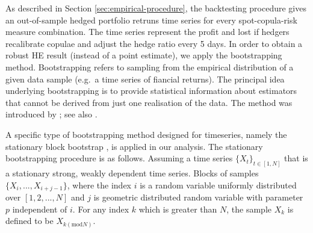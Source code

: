 

As described in Section \ref{sec:empirical-procedure}, the backtesting procedure gives
an out-of-sample hedged portfolio retruns time series for every spot-copula-risk measure combination. 
The time series represent the profit and lost if hedgers recalibrate copulae and adjust the hedge ratio every 5 days.  
In order to obtain a robust HE result (instead of a point estimate), we apply the bootstrapping method.
Bootstrapping refers to sampling from the empirical distribution of a
given data sample (e.g.\ a time series of fiancial returns). The
principal idea underlying bootstrapping is to provide statistical
information about estimators that cannot be derived from just one
realisation of the data. The method was introduced by
\cite{Efron1979}; see also \citep{efron1994introduction, davison1997bootstrap}. 

A specific type of bootstrapping method designed for timeseries, namely the stationary block bootstrap \cite{Politis1994}, is applied in our analysis.
The stationary bootstrapping procedure is as follows. 
Assuming a time series $\{X_t\}_{t \in [1,N]}$ that is
a stationary strong, weakly dependent time series. 
Blocks of samples $\{X_i, ..., X_{i+j-1}\}$, where the index $i$ is a
random variable uniformly distributed over 
$[1,2,...,N]$ and $j$ is geometric distributed random variable with
parameter $p$ independent of $i$. 
For any index $k$ which is greater than $N$, the sample $X_k$ is
defined to be $X_{k(\mathrm{mod} N)}$. 




